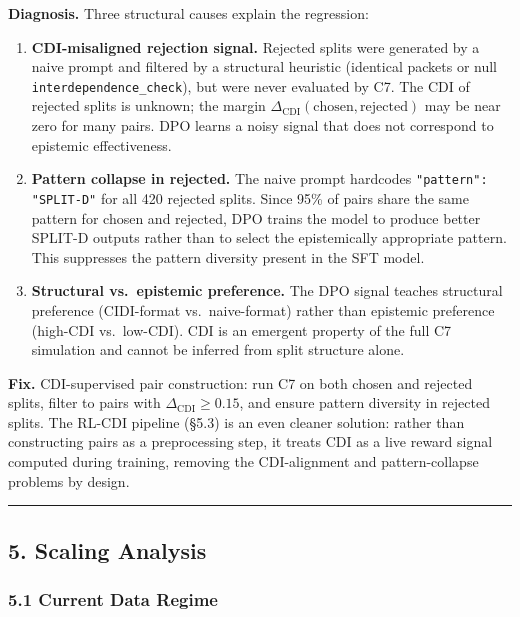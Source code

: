 \documentclass[
  11pt,
]{article}
\begin{document}
\textbf{Diagnosis.} Three structural causes explain the regression:

\begin{enumerate}
\item \textbf{CDI-misaligned rejection signal.} Rejected splits were generated by a naive prompt and filtered by a structural heuristic (identical packets or null \texttt{interdependence\_check}), but were never evaluated by C7. The CDI of rejected splits is unknown; the margin $\Delta_\text{CDI}(\text{chosen}, \text{rejected})$ may be near zero for many pairs. DPO learns a noisy signal that does not correspond to epistemic effectiveness.

\item \textbf{Pattern collapse in rejected.} The naive prompt hardcodes \texttt{"pattern": "SPLIT-D"} for all 420 rejected splits. Since 95\% of pairs share the same pattern for chosen and rejected, DPO trains the model to produce better SPLIT-D outputs rather than to select the epistemically appropriate pattern. This suppresses the pattern diversity present in the SFT model.

\item \textbf{Structural vs.\ epistemic preference.} The DPO signal teaches structural preference (CIDI-format vs.\ naive-format) rather than epistemic preference (high-CDI vs.\ low-CDI). CDI is an emergent property of the full C7 simulation and cannot be inferred from split structure alone.
\end{enumerate}

\textbf{Fix.} CDI-supervised pair construction: run C7 on both chosen and rejected splits, filter to pairs with $\Delta_\text{CDI} \geq 0.15$, and ensure pattern diversity in rejected splits. The RL-CDI pipeline (\S5.3) is an even cleaner solution: rather than constructing pairs as a preprocessing step, it treats CDI as a live reward signal computed during training, removing the CDI-alignment and pattern-collapse problems by design.

\begin{center}\rule{0.5\linewidth}{0.5pt}\end{center}

\subsection{5. Scaling Analysis}\label{scaling-analysis}

\subsubsection{5.1 Current Data Regime}\label{current-data-regime}
\end{document}
